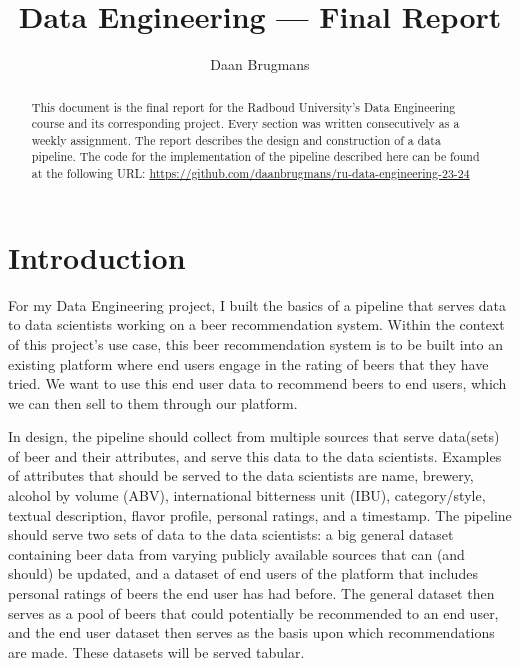 \documentclass[sigconf]{acmart}
\begin{document}
\title[]{Data Engineering --- Final Report}

\author{Daan Brugmans}

\renewcommand{\shortauthors}{Daan Brugmans}

\begin{abstract}
  This document is the final report for the Radboud University's Data Engineering course and its corresponding project.
  Every section was written consecutively as a weekly assignment.
  The report describes the design and construction of a data pipeline.
  The code for the implementation of the pipeline described here can be found at the following URL: \url{https://github.com/daanbrugmans/ru-data-engineering-23-24}
\end{abstract}

\maketitle

\section{Introduction}
For my Data Engineering project, I built the basics of a pipeline that serves data to data scientists working on a beer recommendation system.
Within the context of this project's use case, this beer recommendation system is to be built into an existing platform where end users engage in the rating of beers that they have tried.
We want to use this end user data to recommend beers to end users, which we can then sell to them through our platform.

In design, the pipeline should collect from multiple sources that serve data(sets) of beer and their attributes, and serve this data to the data scientists.
Examples of attributes that should be served to the data scientists are name, brewery, alcohol by volume (ABV), international bitterness unit (IBU), category/style, textual description, flavor profile, personal ratings, and a timestamp.
The pipeline should serve two sets of data to the data scientists: a big general dataset containing beer data from varying publicly available sources that can (and should) be updated, and a dataset of end users of the platform that includes personal ratings of beers the end user has had before.
The general dataset then serves as a pool of beers that could potentially be recommended to an end user, and the end user dataset then serves as the basis upon which recommendations are made.
These datasets will be served tabular.
\end{document}

